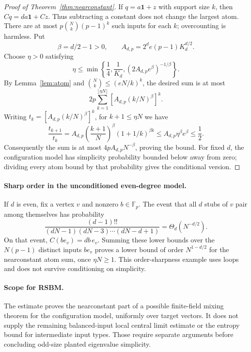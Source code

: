 \documentclass[11pt]{article}
\newcommand{\Fp}{\mathbb F_p}
\begin{document}
\begin{proof}[Proof of Theorem~\ref{thm:nearconstant}]
If $q=a\mathbf1+z$ with support size $k$, then
$Cq=da\mathbf1+Cz$. Thus subtracting a constant does not change the
largest atom. There are at most $p\binom Nk(p-1)^k$ such inputs for
each $k$; overcounting is harmless. Put
\[
 \beta=d/2-1>0,\qquad
 A_{d,p}=2^d e(p-1)K_d^{d/2}.
\]
Choose $\eta>0$ satisfying
\[
 \eta\le\min\left\{\frac14,\frac1{K_d},
            (2A_{d,p}e^\beta)^{-1/\beta}\right\}.
\]
By Lemma~\ref{lem:atom} and $\binom Nk\le(eN/k)^k$, the desired sum
is at most
\[
 2p\sum_{k=1}^{\lfloor\eta N\rfloor}
 \left[A_{d,p}(k/N)^\beta\right]^k.
\]
Writing $t_k=[A_{d,p}(k/N)^\beta]^k$, for $k+1\le\eta N$ we have
\[
 \frac{t_{k+1}}{t_k}
 =A_{d,p}\left(\frac{k+1}{N}\right)^\beta
        (1+1/k)^{\beta k}
 \le A_{d,p}\eta^\beta e^\beta\le\frac12.
\]
Consequently the sum is at most $4p A_{d,p}N^{-\beta}$, proving the
bound. For fixed $d$, the configuration model has simplicity probability
bounded below away from zero; dividing every atom bound by that
probability gives the conditional version.
\end{proof}

\paragraph{Sharp order in the unconditioned even-degree model.}
If $d$ is even, fix a vertex $v$ and nonzero $b\in\Fp$. The event that
all $d$ stubs of $v$ pair among themselves has probability
\[
 \frac{(d-1)!!}{(dN-1)(dN-3)\cdots(dN-d+1)}
 =\Theta_d(N^{-d/2}).
\]
On that event, $C(be_v)=db\,e_v$. Summing these lower bounds over
the $N(p-1)$ distinct inputs $be_v$ proves a lower bound of order
$N^{1-d/2}$ for the nearconstant atom sum, once $\eta N\ge1$.
This order-sharpness example uses loops and does not survive
conditioning on simplicity.

\paragraph{Scope for RSBM.}
The estimate proves the nearconstant part of a possible finite-field
mixing theorem for the configuration model, uniformly over target
vectors. It does not supply the remaining balanced-input local central
limit estimate or the entropy bound for intermediate input types.
Those require separate arguments before concluding odd-size planted
eigenvalue simplicity.
\end{document}
